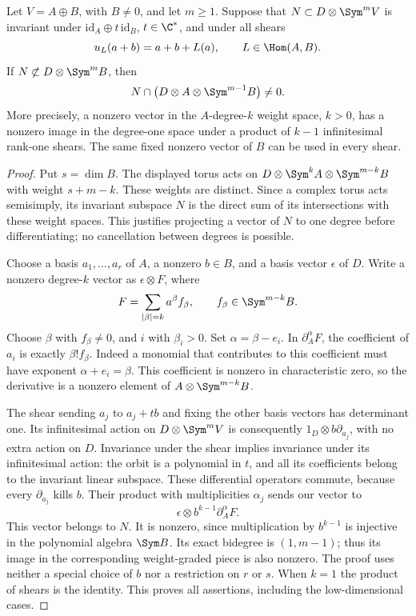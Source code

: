 \begin{lemma}
\label{lem:shear-descent}
Let \(V=A\oplus B\), with \(B\ne0\), and let \(m\ge1\).
Suppose that \(N\subset D\otimes\Sym^mV\) is invariant under
\(\mathrm{id}_A\oplus t\,\mathrm{id}_B\), \(t\in\C^*\),
and under all shears
\[
 u_L(a+b)=a+b+L(a),\qquad L\in\Hom(A,B).
\]
If \(N\not\subset D\otimes\Sym^mB\), then
\[
 N\cap\bigl(D\otimes A\otimes\Sym^{m-1}B\bigr)\ne0.
\]
More precisely, a nonzero vector in the \(A\)-degree-\(k\)
weight space, \(k>0\), has a nonzero image in the degree-one
space under a product of \(k-1\) infinitesimal rank-one shears.
The same fixed nonzero vector of \(B\) can be used in every shear.
\end{lemma}
\begin{proof}
Put \(s=\dim B\).  The displayed torus acts on
\(D\otimes\Sym^kA\otimes\Sym^{m-k}B\) with weight
\(s+m-k\).  These weights are distinct.  Since a complex torus
acts semisimply, its invariant subspace \(N\) is the direct sum
of its intersections with these weight spaces.  This justifies
projecting a vector of \(N\) to one degree before differentiating;
no cancellation between degrees is possible.

Choose a basis \(a_1,\ldots,a_r\) of \(A\), a nonzero
\(b\in B\), and a basis vector \(\epsilon\) of \(D\).
Write a nonzero degree-\(k\) vector as \(\epsilon\otimes F\),
where
\[
 F=\sum_{|\beta|=k}a^\beta f_\beta,\qquad
                 f_\beta\in\Sym^{m-k}B.
\]
Choose \(\beta\) with \(f_\beta\ne0\), and \(i\) with
\(\beta_i>0\).  Set \(\alpha=\beta-e_i\).  In
\(\partial_A^\alpha F\), the coefficient of \(a_i\) is
exactly \(\beta!f_\beta\).  Indeed a monomial that contributes
to this coefficient must have exponent \(\alpha+e_i=\beta\).
This coefficient is nonzero in characteristic zero, so the derivative
is a nonzero element of \(A\otimes\Sym^{m-k}B\).

The shear sending \(a_j\) to \(a_j+tb\) and fixing the other
basis vectors has determinant one.  Its infinitesimal action on
\(D\otimes\Sym^mV\) is consequently
\(1_D\otimes b\partial_{a_j}\), with no extra action on
\(D\).  Invariance under the shear implies invariance under its
infinitesimal action: the orbit is a polynomial in \(t\), and
all its coefficients belong to the invariant linear subspace.
These differential operators commute, because every
\(\partial_{a_j}\) kills \(b\).  Their product with
multiplicities \(\alpha_j\) sends our vector to
\[
 \epsilon\otimes b^{k-1}\partial_A^\alpha F.
\]
This vector belongs to \(N\).  It is nonzero, since multiplication
by \(b^{k-1}\) is injective in the polynomial algebra \(\Sym B\).
Its exact bidegree is \((1,m-1)\); thus its image in the corresponding
weight-graded piece is also nonzero.  The proof uses neither a special
choice of \(b\) nor a restriction on \(r\) or \(s\).  When
\(k=1\) the product of shears is the identity.  This proves all
assertions, including the low-dimensional cases.
\end{proof}

